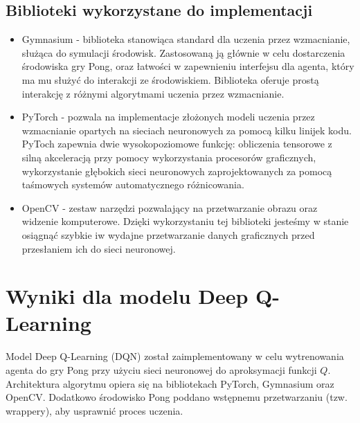 \documentclass[a4paper, 12pt]{article}
\numberwithin{equation}{section}
\begin{document}
    \subsection{Biblioteki wykorzystane do implementacji}
    \begin{itemize}    
        \item Gymnasium \cite{gymnasium2025} - biblioteka stanowiąca standard dla uczenia przez wzmacnianie, służąca do symulacji środowisk. Zastosowaną ją głównie w celu dostarczenia środowiska gry Pong, oraz
        łatwości w zapewnieniu interfejsu dla agenta, który ma mu służyć do interakcji ze środowiskiem. Biblioteka oferuje prostą interakcję z różnymi algorytmami uczenia przez wzmacnianie.
        \item PyTorch \cite{pytorch2025} - pozwala na implementacje złożonych modeli uczenia przez wzmacnianie opartych na sieciach neuronowych za pomocą kilku linijek kodu. 
        PyToch zapewnia dwie wysokopoziomowe funkcję: obliczenia tensorowe z silną akceleracją przy pomocy wykorzystania procesorów graficznych, 
        wykorzystanie głębokich sieci neuronowych zaprojektowanych za pomocą taśmowych systemów automatycznego różnicowania.
        \item OpenCV \cite{opencv2025} - zestaw narzędzi pozwalający na przetwarzanie obrazu oraz widzenie komputerowe. Dzięki wykorzystaniu tej biblioteki jesteśmy w stanie
        osiągnąć szybkie iw wydajne przetwarzanie danych graficznych przed przesłaniem ich do sieci neuronowej. 
    \end{itemize}
    \section{Wyniki dla modelu Deep Q-Learning}
    Model Deep Q-Learning (DQN) został zaimplementowany w celu wytrenowania agenta do gry Pong przy użyciu sieci neuronowej do aproksymacji funkcji \( Q \). Architektura algorytmu opiera się na bibliotekach PyTorch, Gymnasium oraz OpenCV. Dodatkowo środowisko Pong poddano wstępnemu przetwarzaniu (tzw. wrappery), aby usprawnić proces uczenia.
    \newpage
\end{document}
